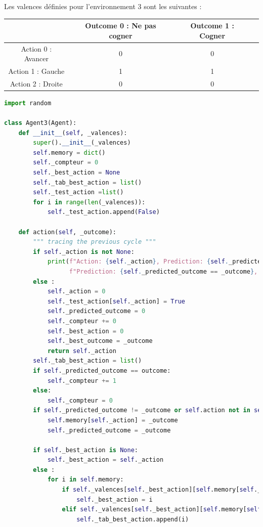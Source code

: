 \documentclass[a4paper, 12pt]{article}
\begin{document}
Les valences définies pour l'environnement 3 sont les suivantes :

\begin{center}
\begin{tabular}{|c|c|c|c|}
\hline
& Outcome 0 : Ne pas cogner & Outcome 1 : Cogner \\
\hline
Action 0 : Avancer & 0 & 0 \\
\hline
Action 1 : Gauche & 1 & 1 \\
\hline
Action 2 : Droite & 0 & 0 \\
\hline
\end{tabular}
\end{center}

\begin{lstlisting}[language=Python, caption={Implementation de l'Agent3}]
import random

class Agent3(Agent):
    def __init__(self, _valences):
        super().__init__(_valences)
        self.memory = dict()
        self._compteur = 0
        self._best_action = None
        self._tab_best_action = list()
        self._test_action =list()
        for i in range(len(_valences)):
            self._test_action.append(False)
        
    def action(self, _outcome):
        """ tracing the previous cycle """
        if self._action is not None:
            print(f"Action: {self._action}, Prediction: {self._predicted_outcome}, Outcome: {_outcome}, "
                  f"Prediction: {self._predicted_outcome == _outcome}, Valence: {self._valences[self._action][_outcome]}")
        else :
            self._action = 0
            self._test_action[self._action] = True
            self._predicted_outcome = 0
            self._compteur += 0
            self._best_action = 0
            self._best_outcome = _outcome
            return self._action
        self._tab_best_action = list()
        if self._predicted_outcome == outcome:
            self._compteur += 1
        else:
            self._compteur = 0
        if self._predicted_outcome != _outcome or self.action not in self.memory:
            self.memory[self._action] = _outcome
            self._predicted_outcome = _outcome
            
        if self._best_action is None:
            self._best_action = self._action
        else :
            for i in self.memory:
                if self._valences[self._best_action][self.memory[self._best_action]] < self._valences[i][self.memory[i]]:
                    self._best_action = i
                elif self._valences[self._best_action][self.memory[self._best_action]] == self._valences[i][self.memory[i]]:
                    self._tab_best_action.append(i)
            

\end{lstlisting}
\end{document}
